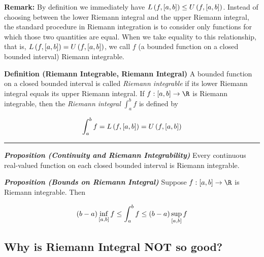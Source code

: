 \documentclass[
]{article}
\begin{document}
\textbf{Remark:} By definition we immediately have
\(L\left(f,\left[a,b\right]\right)\le U\left(f,\left[a,b\right]\right)\). Instead of choosing between
the lower Riemann integral and the upper Riemann integral, the standard
procedure in Riemann integration is to consider only functions for which
those two quantities are equal. When we take equality to this
relationship, that is, \(L\left(f,\left[a,b\right]\right) = U\left(f,\left[a,b\right]\right)\), we call
\(f\) (a bounded function on a closed bounded interval) Riemann
integrable.

\textbf{Definition (Riemann Integrable, Riemann Integral)} A bounded
function on a closed bounded interval is called \emph{Riemann
integrable} if its lower Riemann integral equals its upper Riemann
integral. If \(f:\br{a,b}\to \R\) is Riemann integrable, then the
\emph{Riemann integral} \(\int_a^b f\) is defined by

\[\int_a^b f = L\left(f,\left[a,b\right]\right) = U\left(f,\left[a,b\right]\right)\]

\begin{center}\rule{0.5\linewidth}{0.5pt}\end{center}

\emph{\textbf{Proposition (Continuity and Riemann Integrability)}} Every
continuous real-valued function on each closed bounded interval is
Riemann integrable.

\emph{\textbf{Proposition (Bounds on Riemann Integral)}} Suppose
\(f:\br{a,b}\to \R\) is Riemann integrable. Then

\[\left(b-a\right)\inf_{\left[a,b\right]}f\le \int_a^b f\le \left(b-a\right)\sup_{\left[a,b\right]}f\]

\hypertarget{why-is-riemann-integral-not-so-good}{%
\subsection{Why is Riemann Integral NOT so
good?}\label{why-is-riemann-integral-not-so-good}}
\end{document}

